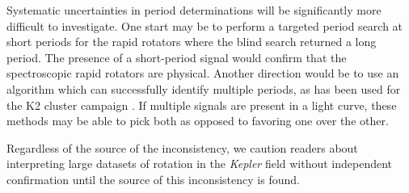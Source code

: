 \documentclass[manuscript]{aastex6}
\newcommand{\Kepler}{\mbox{\textit{Kepler}}}
\begin{document}
Systematic uncertainties in period determinations will be significantly more
difficult to investigate. One start may be to perform a targeted period search
at short periods for the rapid rotators where the blind search returned a long
period. The presence of a short-period signal would confirm that the
spectroscopic rapid rotators are physical. Another direction would be to use an
algorithm which can successfully identify multiple periods, as has been used
for the K2 cluster campaign \citep{Rebull16,Rebull17}. If multiple signals are
present in a light curve, these methods may be able to pick both as opposed to
favoring one over the other.

Regardless of the source of the inconsistency, we caution readers about 
interpreting large datasets of rotation in the \Kepler{} field without 
independent confirmation until the source of this inconsistency is found.




\end{document}
